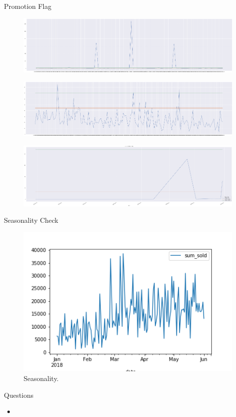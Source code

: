 \documentclass[10pt, xcolor=dvipsnames]{beamer}
\begin{document}
\begin{frame}{Promotion Flag}
\begin{figure}
\includegraphics[width=.75\textwidth]{prom1.png}
\end{figure}
\begin{figure}
\includegraphics[width=.75\textwidth]{prom2.png}
\end{figure}
\begin{figure}
\includegraphics[width=.75\textwidth]{prom3.png}
\end{figure}
\end{frame}

\begin{frame}{Seasonality Check}
\begin{figure}
\includegraphics[width=.8\textwidth]{season.png}
\caption{Seasonality.}
\end{figure}
\end{frame}

\begin{frame}{Questions}
        \begin{itemize}
         \item
        \end{itemize}
\end{frame}
\end{document}
